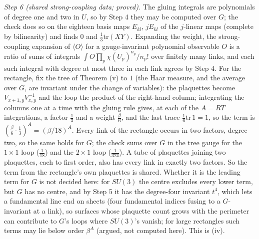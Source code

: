 \emph{Step 6 (shared strong-coupling data; proved).} The gluing integrals are polynomials of degree one and two in $U$, so by Step 4 they may be computed over $G$; the check does so on the eighteen basis maps $E_{kl}$, $jE_{kl}$ of the $j$-linear maps (complete by bilinearity) and finds $0$ and $\tfrac13\mathrm{tr}(XY)$. Expanding the weight, the strong-coupling expansion of $\langle O\rangle$ for a gauge-invariant polynomial observable $O$ is a ratio of sums of integrals $\int O\prod_{p}\chi(U_{p})^{n_{p}}/n_{p}!$ over finitely many links, and each such integral with degree at most three in each link agrees by Step 4. For the rectangle, fix the tree of Theorem (v) to $1$ (the Haar measure, and the average over $G$, are invariant under the change of variables): the plaquettes become $V_{x+1,y}V_{x,y}^{-1}$ and the loop the product of the right-hand column; integrating the columns one at a time with the gluing rule gives, at each of the $A = RT$ integrations, a factor $\tfrac13$ and a weight $\tfrac{\beta}{6}$, and the last trace $\tfrac16\mathrm{tr}\,1 = 1$, so the term is $(\tfrac{\beta}{6}\cdot\tfrac13)^{A} = (\beta/18)^{A}$. Every link of the rectangle occurs in two factors, degree two, so the same holds for $G$; the check sums over $G$ in the tree gauge for the $1 \times 1$ loop ($\tfrac{1}{18}$) and the $2 \times 1$ loop ($\tfrac{1}{324}$). A tube of plaquettes joining two plaquettes, each to first order, also has every link in exactly two factors. So the term from the rectangle's own plaquettes is shared. Whether it is the leading term for $G$ is not decided here: for $SU(3)$ the centre excludes every lower term, but $G$ has no centre, and by Step 5 it has the degree-four invariant $t^{4}$, which lets a fundamental line end on sheets (four fundamental indices fusing to a $G$-invariant at a link), so surfaces whose plaquette count grows with the perimeter can contribute to $G$'s loops where $SU(3)$'s vanish; for large rectangles such terms may lie below order $\beta^{A}$ (argued, not computed here). This is (iv).

